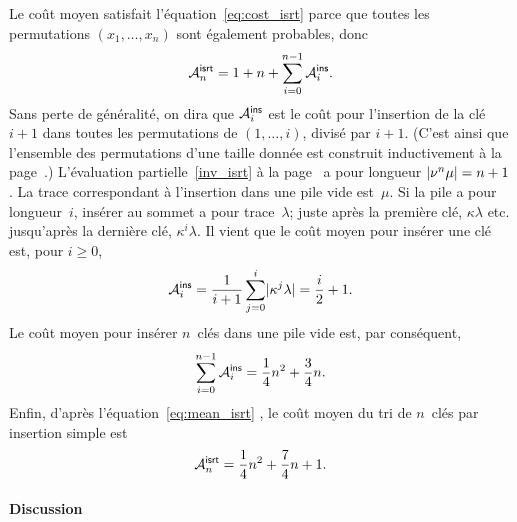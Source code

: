 Le coût moyen satisfait l'équation~\eqref{eq:cost_isrt} parce que
toutes les permutations \((x_1,\dots,x_n)\) sont également probables, donc
\begin{equation}
\M{\fun{isrt}}{n} = 1 + n + \sum_{i=0}^{n-1}\M{\fun{ins}}{i}.
\label{eq:mean_isrt}
\end{equation}
Sans perte de généralité, on dira que
\(\M{\fun{ins}}{i}\) est le coût pour
l'insertion de la clé \(i+1\) dans toutes les permutations de
\((1,\dots,i)\), divisé par \(i+1\). (C'est ainsi que l'ensemble des
permutations d'une taille donnée est construit
inductivement à la page~\pageref{par:permutations}.) L'évaluation
partielle~\eqref{inv_isrt} à la page~\pageref{inv_isrt} a pour longueur
\(\len{\nu^n\mu}=n+1\). La trace correspondant à l'insertion dans une
pile vide est~\(\mu\). Si la pile a pour longueur~\(i\), insérer au
sommet a pour trace~\(\lambda\); juste après la première clé,
\(\kappa\lambda\) etc. jusqu'après la dernière clé,
\(\kappa^i\lambda\). Il vient que le coût moyen pour insérer une clé
est, pour \(i \geqslant 0\),
\begin{equation}
\M{\fun{ins}}{i} = \frac{1}{i+1}\sum_{j=0}^{i}\len{\kappa^j\lambda}
                 = \frac{i}{2}+1.
\label{eq:ins}
\end{equation}
Le coût moyen pour insérer \(n\)~clés dans une pile vide est, par
conséquent,
\begin{equation*}
  \sum_{i=0}^{n-1}\M{\fun{ins}}{i} = \frac{1}{4}n^2 + \frac{3}{4}n.
\end{equation*}
Enfin, d'après l'équation~\eqref{eq:mean_isrt}
, le coût moyen du tri de \(n\)~clés par
insertion simple est
\begin{equation*}
\M{\fun{isrt}}{n} = \frac{1}{4}n^2 + \frac{7}{4}n + 1.
\end{equation*}

\paragraph{Discussion}

